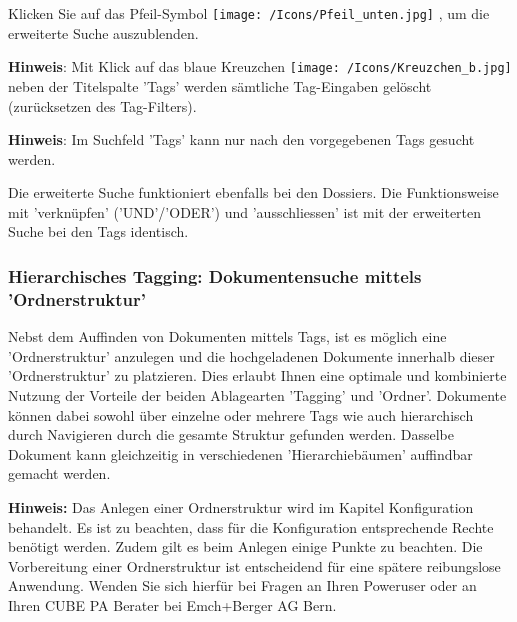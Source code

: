 Klicken Sie auf das Pfeil-Symbol \texttt{[image: /Icons/Pfeil\_unten.jpg]} , um die erweiterte Suche auszublenden.

\vspace{\baselineskip}

\textbf{Hinweis}: Mit Klick auf das blaue Kreuzchen \texttt{[image: /Icons/Kreuzchen\_b.jpg]} neben der Titelspalte 'Tags' werden sämtliche Tag-Eingaben gelöscht (zurücksetzen des Tag-Filters).

\vspace{\baselineskip}

\textbf{Hinweis}: Im Suchfeld 'Tags' kann nur nach den vorgegebenen Tags gesucht werden. 

\vspace{\baselineskip}

Die erweiterte Suche funktioniert ebenfalls bei den Dossiers. Die Funktionsweise mit 'verknüpfen' ('UND'/'ODER') und 'ausschliessen' ist mit der erweiterten Suche bei den Tags identisch.

\subsubsection{Hierarchisches Tagging: Dokumentensuche mittels 'Ordnerstruktur'}
\label{bkm:Ref201801849}

Nebst dem Auffinden von Dokumenten mittels Tags, ist es möglich eine 'Ordnerstruktur' anzulegen und die hochgeladenen Dokumente innerhalb dieser 'Ordnerstruktur' zu platzieren. Dies erlaubt Ihnen eine optimale und kombinierte Nutzung der Vorteile der beiden Ablagearten 'Tagging' und 'Ordner'. Dokumente können dabei sowohl über einzelne oder mehrere Tags wie auch hierarchisch durch Navigieren durch die gesamte Struktur gefunden werden. Dasselbe Dokument kann gleichzeitig in verschiedenen 'Hierarchiebäumen' auffindbar gemacht werden.

\vspace{\baselineskip}

\textbf{Hinweis:} Das Anlegen einer Ordnerstruktur wird im Kapitel Konfiguration behandelt. Es ist zu beachten, dass für die Konfiguration entsprechende Rechte benötigt werden. Zudem gilt es beim Anlegen einige Punkte zu beachten. Die Vorbereitung einer Ordnerstruktur ist entscheidend für eine spätere reibungslose Anwendung. Wenden Sie sich hierfür bei Fragen an Ihren Poweruser oder an Ihren CUBE PA Berater bei Emch+Berger AG Bern.

\vspace{\baselineskip}

